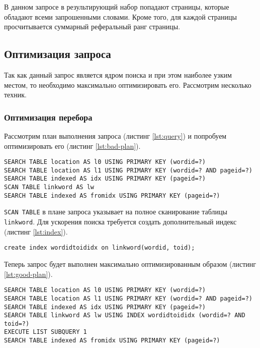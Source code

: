 В данном запросе в результирующий набор попадают страницы, которые обладают всеми запрошенными словами. Кроме того, для каждой страницы просчитывается суммарный реферальный ранг страницы.


\subsection{Оптимизация запроса}
Так как данный запрос является ядром поиска и при этом наиболее узким местом, то необходимо максимально оптимизировать его. Рассмотрим несколько техник.


\subsubsection{Оптимизация перебора} \label{sssec:optimization}
Рассмотрим план выполнения запроса (листинг \ref{lst:query}) и попробуем оптимизировать его (листинг \ref{lst:bad-plan}).
\begin{lstlisting}[language=sql-explain, caption=Неоптимальный план выполнения запроса., label=lst:bad-plan]
SEARCH TABLE location AS l0 USING PRIMARY KEY (wordid=?)
SEARCH TABLE location AS l1 USING PRIMARY KEY (wordid=? AND pageid=?)
SEARCH TABLE indexed AS idx USING PRIMARY KEY (pageid=?)
SCAN TABLE linkword AS lw
SEARCH TABLE indexed AS fromidx USING PRIMARY KEY (pageid=?)
\end{lstlisting}

\verb|SCAN TABLE| в плане запроса указывает на полное сканирование таблицы \verb|linkword|. Для ускорения поиска требуется создать дополнительный индекс (листинг \ref{lst:index}).
\begin{lstlisting}[language=sqlite, caption=Создание индекса., label=lst:index]
create index wordidtoididx on linkword(wordid, toid);
\end{lstlisting}

Теперь запрос будет выполнен максимально оптимизированным образом (листинг \ref{lst:good-plan}).
\begin{lstlisting}[language=sql-explain, caption=Оптимальный план выполнения запроса., label=lst:good-plan]
SEARCH TABLE location AS l0 USING PRIMARY KEY (wordid=?)
SEARCH TABLE location AS l1 USING PRIMARY KEY (wordid=? AND pageid=?)
SEARCH TABLE indexed AS idx USING PRIMARY KEY (pageid=?)
SEARCH TABLE linkword AS lw USING INDEX wordidtoididx (wordid=? AND toid=?)
EXECUTE LIST SUBQUERY 1
SEARCH TABLE indexed AS fromidx USING PRIMARY KEY (pageid=?)
\end{lstlisting}


